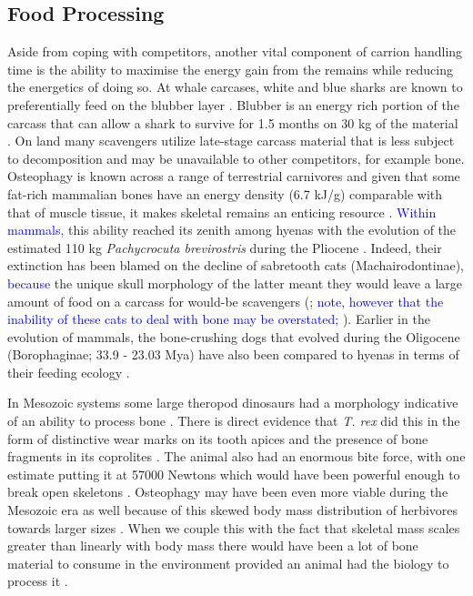\documentclass[a4paper,12pt]{article}
\begin{document}
\subsection{Food Processing}
Aside from coping with competitors, another vital component of carrion handling time is the ability to maximise the energy gain from the remains while reducing the energetics of doing so. 
At whale carcases, white and blue sharks are known to preferentially feed on the blubber layer \citep{long1996sharks}. 
Blubber is an energy rich portion of the carcass that can allow a shark to survive for 1.5 months on 30 kg of the material \citep{carey1982temperature}. 
On land many scavengers utilize late-stage carcass material that is less subject to decomposition and may be unavailable to other competitors, for example bone.
Osteophagy is known across a range of terrestrial carnivores and given that some fat-rich mammalian bones have an energy density (6.7 kJ/g) comparable with that of muscle tissue, it makes skeletal remains an enticing resource \citep{brown1989study}.
\textcolor{blue}{Within mammals,} this ability reached its zenith among hyenas with the evolution of the estimated 110 kg \textit{Pachycrocuta brevirostris} during the Pliocene \citep[3.6 - 2.58 Mya; ][]{palmqvist2011giant}.
Indeed, their extinction has been blamed on the decline of sabretooth cats (Machairodontinae), \textcolor{blue}{because} the unique skull morphology of the latter meant they would leave a large amount of food on a carcass for would-be scavengers (\citealt{palmqvist2011giant}; \textcolor{blue}{note, however that the inability of these cats to deal with bone may be overstated; \citealt{binder2010comparison}}). 
Earlier in the evolution of mammals, the bone-crushing dogs that evolved during the Oligocene (Borophaginae; 33.9 - 23.03 Mya) have also been compared to hyenas in terms of their feeding ecology \citep{van2003chapter,martin2016pursuit}.

In Mesozoic systems some large theropod dinosaurs had a morphology indicative of an ability to process bone \citep[e.g. the robust skull and dentition of \textit{Tyrannosaurus rex;}][]{hone2010feeding}.
There is direct evidence that \textit{T. rex} did this in the form of distinctive wear marks on its tooth apices \citep{farlow1994wear,schubert2005wear} and the presence of bone fragments in its coprolites \citep{chin1998king}.
The animal also had an enormous bite force, with one estimate putting it at 57000 Newtons \citep{bates2012estimating} which would have been powerful enough to break open skeletons \citep{rayfield2001cranial}.
Osteophagy may have been even more viable during the Mesozoic era as well because of this skewed body mass distribution of herbivores towards larger sizes \citep{10.1371/journal.pone.0051925}.
When we couple this with the fact that skeletal mass scales greater than linearly with body mass \citep{prange1979scaling} there would have been a lot of bone material to consume in the environment provided an animal had the biology to process it \citep{chure1997one}.
\end{document}
